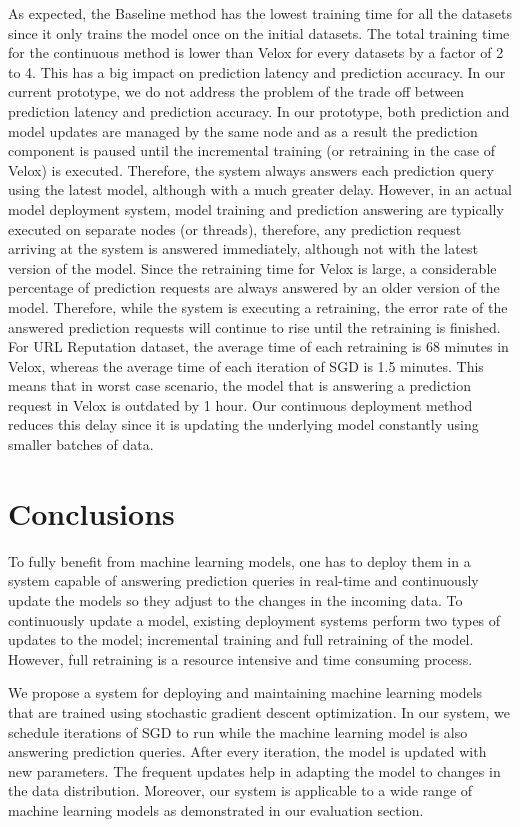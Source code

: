 \documentclass{vldb}
\begin{document}
As expected, the Baseline method has the lowest training time for all the datasets since it only trains the model once on the initial datasets.
The total training time for the continuous method is lower than Velox for every datasets by a factor of 2 to 4.
This has a big impact on prediction latency and prediction accuracy.
In our current prototype, we do not address the problem of the trade off between prediction latency and prediction accuracy.
In our prototype, both prediction and model updates are managed by the same node and as a result the prediction component is paused until the incremental training (or retraining in the case of Velox) is executed.
Therefore, the system always answers each prediction query using the latest model, although with a much greater delay.
However, in an actual model deployment system, model training and prediction answering are typically executed on separate nodes (or threads), therefore, any prediction request arriving at the system is answered immediately, although not with the latest version of the model.
Since the retraining time for Velox is large, a considerable percentage of prediction requests are always answered by an older version of the model.
{\color{green}Therefore, while the system is executing a retraining, the error rate of the answered prediction requests will continue to rise until the retraining is finished.
For URL Reputation dataset, the average time of each retraining is 68 minutes in Velox, whereas the average time of each iteration of SGD is 1.5 minutes.
This means that in worst case scenario, the model that is answering a prediction request in Velox is outdated by 1 hour.
Our continuous deployment method reduces this delay since it is updating the underlying model constantly using smaller batches of data.} 

\section{Conclusions} \label{conclusion}
To fully benefit from machine learning models, one has to deploy them in a system capable of answering prediction queries in real-time and continuously update the models so they adjust to the changes in the incoming data.
To continuously update a model, existing deployment systems perform two types of updates to the model; incremental training and full retraining of the model.
However, full retraining is a resource intensive and time consuming process.

We propose a system for deploying and maintaining machine learning models that are trained using stochastic gradient descent optimization.
In our system, we schedule iterations of SGD to run while the machine learning model is also answering prediction queries.
After every iteration, the model is updated with new parameters.
The frequent updates help in adapting the model to changes in the data distribution.
Moreover, our system is applicable to a wide range of machine learning models as demonstrated in our evaluation section.
\end{document}
